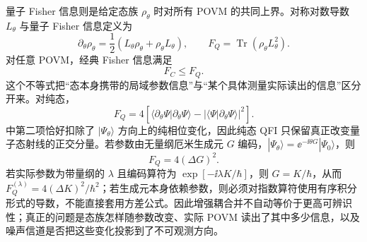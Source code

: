量子 Fisher 信息则是给定态族 $\rho_\theta$ 时对所有 POVM 的共同上界。对称对数导数 $L_\theta$ 与量子 Fisher 信息定义为
\begin{equation}
\boxed{
\partial_\theta\rho_\theta
=\frac12(L_\theta\rho_\theta+\rho_\theta L_\theta),
\qquad
F_Q=\operatorname{Tr}(\rho_\theta L_\theta^2).}
\label{eq:qfi-sld-definition-dp68}
\end{equation}
对任意 POVM，经典 Fisher 信息满足
\begin{equation}
\boxed{F_C\le F_Q.}
\label{eq:qfi-measurement-upper-bound-dp68}
\end{equation}
这个不等式把“态本身携带的局域参数信息”与“某个具体测量实际读出的信息”区分开来。对纯态，
\begin{equation}
\boxed{
F_Q
=4\left[
\langle\partial_\theta\Psi|\partial_\theta\Psi\rangle
-|\langle\Psi|\partial_\theta\Psi\rangle|^2
\right].}
\label{eq:pure_state_quantum_fisher_general}
\end{equation}
 中第二项恰好扣除了 $|\Psi_\theta\rangle$ 方向上的纯相位变化，因此纯态 QFI 只保留真正改变量子态射线的正交分量。若参数由无量纲厄米生成元 $G$ 编码，$|\Psi_\theta\rangle=\ee^{-\ii\theta G}|\Psi_0\rangle$，则
\begin{equation}
\boxed{F_Q=4(\Delta G)^2.}
\label{eq:unitary_encoding_qfi_variance}
\end{equation}
若实际参数为带量纲的 $\lambda$ 且编码算符为 $\exp[-\ii\lambda K/\hbar]$，则 $G=K/\hbar$，从而 $F_Q^{(\lambda)}=4(\Delta K)^2/\hbar^2$；若生成元本身依赖参数，则必须对指数算符使用有序积分形式的导数，不能直接套用方差公式。因此增强耦合并不自动等价于更高可辨识性；真正的问题是态族怎样随参数改变、实际 POVM 读出了其中多少信息，以及噪声信道是否把这些变化投影到了不可观测方向。

